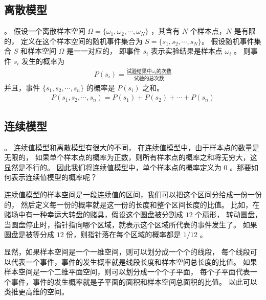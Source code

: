 \documentclass[letterpaper,10pt,english]{sphinxmanual}
\begin{document}
\subsection{离散模型}
\label{\detokenize{_u6982_u7387_u57fa_u7840/content:id4}}
。
假设一个离散样本空间 \(\Omega=\{\omega_1,\omega_2,\cdots,\omega_N \}\)
，其含有 \(N\) 个样本点，\(N\) 是有限的，
定义在这个样本空间的随机事件集合为 \(S=\{s_1,s_2,\cdots,s_N \}\)。
假设随机事件集合 \(S\) 和样本空间 \(\Omega\) 是一一对应的，
即事件 \(s_i\) 表示实验结果是样本点 \(\omega_i\) 。
则事件 \(s_i\) 发生的概率为
\begin{equation}\label{equation:概率基础/content:概率基础/content:3}
\begin{split}P(s_i) = \frac{\text{试验结果中}\omega_i \text{的次数} }{\text{试验的总次数}}\end{split}
\end{equation}
并且，事件 \(\{s_1,s_2,\cdots,s_n\}\) 的概率是 \(P(s_i)\) 之和。
\begin{equation}\label{equation:概率基础/content:概率基础/content:4}
\begin{split}P(s_1,s_2,\cdots,s_n) = P(s_1) + P(s_2)+\cdots + P(s_n)\end{split}
\end{equation}

\subsection{连续模型}
\label{\detokenize{_u6982_u7387_u57fa_u7840/content:id5}}
。
连续值模型和离散模型有很大的不同，
在连续值模型中，由于样本点的数量是无限的，
如果单个样本点的概率为正数，则所有样本点的概率之和将无穷大，这显然是不行的。
因此我们将连续值模型中，单个样本点的概率定义为 \(0\)
。那要如何表示连续值模型的概率呢？

连续值模型的样本空间是一段连续值的区间，我们可以把这个区间分给成一份一份的，
然后定义每一份的概率就是这一份的长度和整个区间长度的比值。
比如，在赌场中有一种幸运大转盘的赌具，假设这个圆盘被分割成 \(12\) 个扇形，
转动圆盘，当圆盘停止时，指针指向哪个区域，就表示这个区域所代表的事件发生了。
如果圆盘是被等分成 \(12\) 份，则指针落在每个区域的概率都是 \(1/12\)
。

显然，如果样本空间是一个一维空间，则可以划分成一个个的线段，
每个线段可以代表一个事件，事件的发生概率就是线段长度和样本空间总长度的比值。
如果样本空间是一个二维平面空间，则可以划分成一个个子平面，
每个子平面代表一个事件，事件的发生概率就是子平面的面积和样本空间总面积的比值。
以此可以类推更高维的空间。
\end{document}

